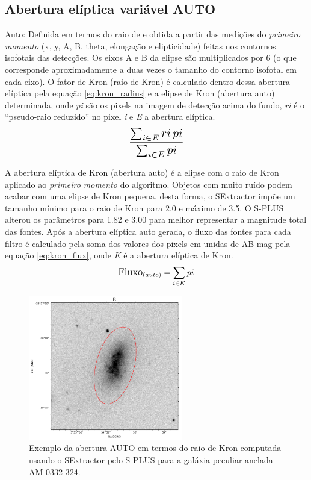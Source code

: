 \subsection{Abertura elíptica variável AUTO}
Auto: Definida em termos do raio de  e obtida a partir das medições do \emph{primeiro momento} (x, y, A, B, theta, elongação e elipticidade) feitas nos contornos isofotais das detecções. Os eixos A e B da elipse são multiplicados por 6 (o que corresponde aproximadamente a duas vezes o tamanho do contorno isofotal em cada eixo). O fator de Kron (raio de Kron) é calculado dentro dessa abertura elíptica pela equação \ref{eq:kron_radius} e a elipse de Kron (abertura auto) determinada, onde \emph{pi} são os pixels na imagem de detecção acima do fundo, \emph{ri} é o ``pseudo-raio reduzido'' no pixel \emph{i} e \emph{E} a abertura elíptica.
\begin{equation} \label{eq:kron_radius}
\scalebox{1.4}{$\displaystyle \frac{\sum_{i \in \mathit{E}} ri \, pi}{\sum_{i \in \mathit{E}} pi}$}
\end{equation}

A abertura elíptica de Kron (abertura auto) é a elipse com o raio de Kron aplicado ao \emph{primeiro momento} do algoritmo. Objetos com muito ruído podem acabar com uma elipse de Kron pequena, desta forma, o SExtractor impõe um tamanho mínimo para o raio de Kron para 2.0 e máximo de 3.5. O S-PLUS alterou os parâmetros para 1.82 e 3.00 para melhor representar a magnitude total das fontes. Após a abertura elíptica auto gerada, o fluxo das fontes para cada filtro é calculado pela soma dos valores dos pixels em unidas de AB mag pela equação \ref{eq:kron_flux}, onde \emph{K} é a abertura elíptica de Kron.
\begin{equation} \label{eq:kron_flux}
\large
\text{Fluxo}_{(auto)} = \sum_{i \in K} pi
\end{equation}

\begin{figure}[h]
  \centering 
  \includegraphics[width=0.6\textwidth]{Imagens/auto_exemplo.png} 
  \caption[Exemplo da abertura AUTO para a galáxia AM 0332-324.]{Exemplo da abertura AUTO em termos do raio de Kron computada usando o SExtractor pelo S-PLUS para a galáxia peculiar anelada AM 0332-324.}
  \label{fig:auto_exemplo} 
\end{figure}

